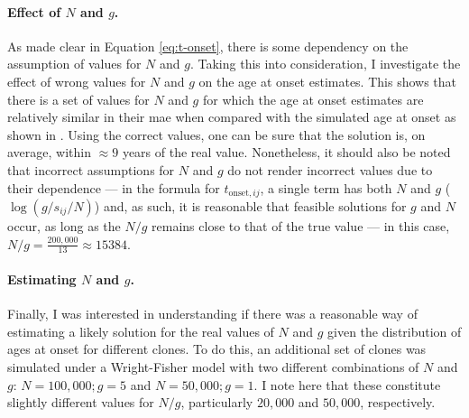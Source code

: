 \paragraph{Effect of $N$ and $g$.} As made clear in Equation \eqref{eq:t-onset}, there is some dependency on the assumption of values for $N$ and $g$. Taking this into consideration, I investigate the effect of wrong values for $N$ and $g$ on the age at onset estimates. This shows that there is a set of values for $N$ and $g$ for which the age at onset estimates are relatively similar in their \ac{mae} when compared with the simulated age at onset as shown in . Using the correct values, one can be sure that the solution is, on average, within $\approx 9$ years of the real value. Nonetheless, it should also be noted that incorrect assumptions for $N$ and $g$ do not render incorrect values due to their dependence --- in the formula for $t_{\mathrm{onset},ij}$, a single term has both $N$ and $g$ ($\log(g/s_{ij}/N)$) and, as such, it is reasonable that feasible solutions for $g$ and $N$ occur, as long as the $N/g$ remains close to that of the true value --- in this case, $N/g = \frac{200,000}{13} \approx 15384$.

\begin{figure}[!ht]
	\label{fig:age-at-onset-mae}
\end{figure}

\paragraph{Estimating $N$ and $g$.} Finally, I was interested in understanding if there was a reasonable way of estimating a likely solution for the real values of $N$ and $g$ given the distribution of ages at onset for different clones. To do this, an additional set of clones was simulated under a Wright-Fisher model with two different combinations of $N$ and $g$: $N=100,000;g=5$ and $N=50,000;g=1$. I note here that these constitute slightly different values for $N/g$, particularly $20,000$ and $50,000$, respectively. 

